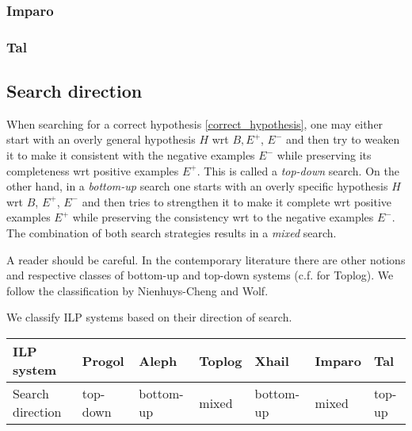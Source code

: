 \subsubsection{Imparo\cite{kimber2012learning}}

\subsubsection{Tal}

\subsection{Search direction\cite{nienhuys1997foundations}}
When searching for a correct hypothesis \ref{correct_hypothesis}, one may either start with an overly general hypothesis $H$ wrt $B, E^+$, $E^-$ and then try to weaken it to make it consistent with the negative examples $E^-$ while preserving its completeness wrt positive examples $E^+$. This is called a \emph{top-down} search.
On the other hand, in a \emph{bottom-up} search one starts with an overly specific hypothesis $H$ wrt $B$, $E^+$, $E^-$ and then tries to strengthen it to make it complete wrt positive examples $E^+$ while preserving the consistency wrt to the negative examples $E^-$.
The combination of both search strategies results in a \emph{mixed} search.

\begin{remark}
A reader should be careful. In the contemporary literature there are other notions and respective classes of bottom-up and top-down systems (c.f.\cite{corapi2010inductive} for Toplog). We follow the classification by Nienhuys-Cheng and Wolf\cite{nienhuys1997foundations}.
\end{remark}

We classify ILP systems based on their direction of search.

\begin{center}
\label{tab:title} 
\begin{tabular}{| l | l | l | l | l | l | l |}
    \hline
    ILP system & Progol & Aleph & Toplog & Xhail & Imparo & Tal \\ \hline
   	Search direction & top-down & bottom-up& mixed & bottom-up & mixed & top-up\\ \hline
\end{tabular}
\end{center}

